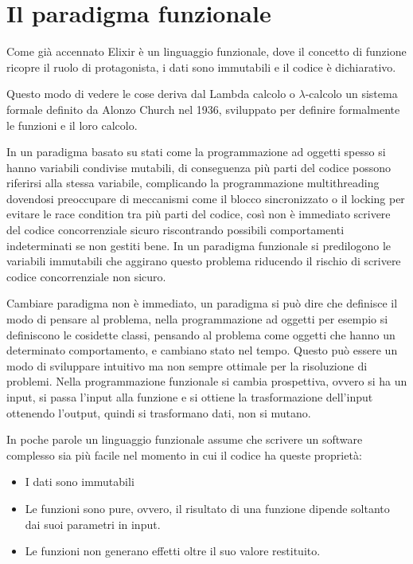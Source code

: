 \section{Il paradigma funzionale}
\renewcommand\lstlistingname{Esempio}
Come già accennato Elixir è un linguaggio funzionale, dove
il concetto di funzione ricopre il ruolo di protagonista,
i dati sono immutabili e il codice è dichiarativo.

Questo modo di vedere le cose deriva dal Lambda calcolo o $\lambda$-calcolo
\cite{Lambdaca75:online}
un sistema formale definito da Alonzo Church nel 1936, sviluppato
per definire formalmente le funzioni e il loro calcolo.

In un paradigma basato su stati come la programmazione ad oggetti
spesso si hanno variabili condivise mutabili, di conseguenza più parti del codice
possono riferirsi alla stessa variabile, complicando la programmazione
multithreading dovendosi preoccupare di meccanismi come il blocco
sincronizzato o il locking per evitare le race condition tra più parti
del codice, così non è immediato scrivere del codice concorrenziale sicuro
riscontrando possibili comportamenti indeterminati se non gestiti bene.
In un paradigma funzionale si predilogono le variabili immutabili che
aggirano questo problema riducendo il rischio di scrivere codice
concorrenziale non sicuro.

Cambiare paradigma non è immediato, un paradigma si può dire che
definisce il modo di pensare al problema, nella programmazione ad
oggetti per esempio si definiscono le cosidette classi,
pensando al problema come oggetti che hanno un determinato comportamento,
e cambiano stato nel tempo.
Questo può essere un modo di sviluppare intuitivo ma non sempre
ottimale per la risoluzione di problemi. Nella programmazione funzionale
si cambia prospettiva, ovvero si ha un input, si passa l'input 
alla funzione e si ottiene la trasformazione dell'input ottenendo
l'output, quindi si trasformano dati, non si mutano.

In poche parole un linguaggio funzionale assume che scrivere un
software complesso sia più facile nel momento in cui il codice ha
queste proprietà:
\begin{itemize}
    \item I dati sono immutabili
    \item Le funzioni sono pure, ovvero, il risultato di una funzione
    dipende soltanto dai suoi parametri in input.
    \item Le funzioni non generano effetti oltre il suo valore restituito.
\end{itemize}

